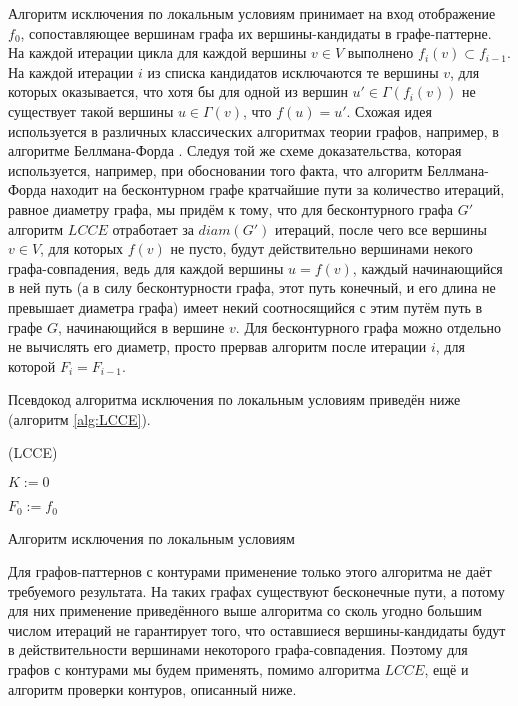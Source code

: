 Алгоритм исключения по локальным условиям принимает на вход отображение $f_0$, сопоставляющее вершинам графа их вершины-кандидаты в графе-паттерне. На каждой итерации цикла для каждой вершины $v \in V$ выполнено $f_{i}(v) \subset f_{i-1}$. На каждой итерации $i$ из списка кандидатов исключаются те вершины $v$, для которых оказывается, что хотя бы для одной из вершин $u' \in \Gamma(f_i(v))$ не существует такой вершины $u \in \Gamma(v)$, что $f(u) = u'$. Схожая идея используется в различных классических алгоритмах теории графов, например, в алгоритме Беллмана-Форда \cite{bellmanford}. Следуя той же схеме доказательства, которая используется, например, при обосновании того факта, что алгоритм Беллмана-Форда находит на бесконтурном графе кратчайшие пути за количество итераций, равное диаметру графа, мы придём к тому, что для бесконтурного графа $G'$ алгоритм $LCCE$ отработает за $diam(G')$ итераций, после чего все вершины $v \in V$, для которых $f(v)$ не пусто, будут действительно вершинами некого графа-совпадения, ведь для каждой вершины $u = f(v)$, каждый начинающийся в ней путь (а в силу бесконтурности графа, этот путь конечный, и его длина не превышает диаметра графа) имеет некий соотносящийся с этим путём путь в графе $G$, начинающийся в вершине $v$. Для бесконтурного графа можно отдельно не вычислять его диаметр, просто прервав алгоритм после итерации $i$, для которой $F_i = F_{i-1}$.

Псевдокод алгоритма исключения по локальным условиям приведён ниже (алгоритм \ref{alg:LCCE}).

\begin{algorithm}[H]
	\Large
	\Begin(LCCE){
		$K := 0$
		
		$F_0 := f_0$
		
	}

	\caption{Алгоритм исключения по локальным условиям}
	\label{alg:LCCE}
\end{algorithm}

Для графов-паттернов с контурами применение только этого алгоритма не даёт требуемого результата. На таких графах существуют бесконечные пути, а потому для них применение приведённого выше алгоритма со сколь угодно большим числом итераций не гарантирует того, что оставшиеся вершины-кандидаты будут в действительности вершинами некоторого графа-совпадения. Поэтому для графов с контурами мы будем применять, помимо алгоритма $LCCE$, ещё и алгоритм проверки контуров, описанный ниже.

